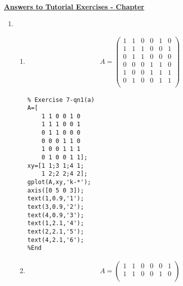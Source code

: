 \newpage

\underline{\textbf{Answers to Tutorial Exercises - Chapter \thechapter}}

\begin{enumerate}
[   topsep  = 3ex
,   itemsep = 4ex
,   parsep  = 2ex
]
\item
    \begin{enumerate}
    [   topsep = 0ex
    ]
    \item
        \begin{minipage}[t]{0.49\linewidth}
            \vspace{-2em}
            \begin{align*}
                A = \begin{pmatrix}
                    1 & 1 & 0 & 0 & 1 & 0\\
                    1 & 1 & 1 & 0 & 0 & 1\\
                    0 & 1 & 1 & 0 & 0 & 0\\
                    0 & 0 & 0 & 1 & 1 & 0\\
                    1 & 0 & 0 & 1 & 1 & 1\\
                    0 & 1 & 0 & 0 & 1 & 1\\
                \end{pmatrix}
            \end{align*}
            \begin{lstlisting}
% Exercise 7-qn1(a)
A=[
    1 1 0 0 1 0
    1 1 1 0 0 1
    0 1 1 0 0 0
    0 0 0 1 1 0
    1 0 0 1 1 1
    0 1 0 0 1 1];
xy=[1 1;3 1;4 1;
    1 2;2 2;4 2];
gplot(A,xy,'k-*');
axis([0 5 0 3]);
text(1,0.9,'1');
text(3,0.9,'2');
text(4,0.9,'3');
text(1,2.1,'4');
text(2,2.1,'5');
text(4,2.1,'6');
%End
            \end{lstlisting}
        \end{minipage}
        \begin{minipage}[t]{0.5\linewidth}
            
        \end{minipage}
\newpage
    \item
        \begin{minipage}[t]{0.49\linewidth}
            \vspace{-2em}
            \begin{align*}
                A = \begin{pmatrix}
                    1 & 1 & 0 & 0 & 0 & 1\\
                    1 & 1 & 0 & 0 & 1 & 0\\

\end{pmatrix}
\end{align*}
\end{minipage}
\end{enumerate}
\end{enumerate}
